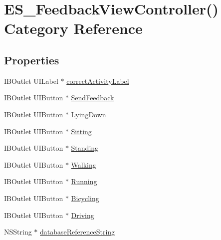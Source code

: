\hypertarget{category_e_s___feedback_view_controller_07_08}{\section{E\+S\+\_\+\+Feedback\+View\+Controller() Category Reference}
\label{category_e_s___feedback_view_controller_07_08}
}
\subsection*{Properties}
\begin{DoxyCompactItemize}
\item 
I\+B\+Outlet U\+I\+Label $\ast$ \hyperlink{category_e_s___feedback_view_controller_07_08_a14a8497fab3b0e86608a9fb3eed36b7f}{correct\+Activity\+Label}
\item 
I\+B\+Outlet U\+I\+Button $\ast$ \hyperlink{category_e_s___feedback_view_controller_07_08_a633997e737c481f734609ea35d69b2c2}{Send\+Feedback}
\item 
I\+B\+Outlet U\+I\+Button $\ast$ \hyperlink{category_e_s___feedback_view_controller_07_08_a07c0e4441a4680a2bd9ab859f7b170fc}{Lying\+Down}
\item 
I\+B\+Outlet U\+I\+Button $\ast$ \hyperlink{category_e_s___feedback_view_controller_07_08_a996c150ceb2ffba793c444bc74144921}{Sitting}
\item 
I\+B\+Outlet U\+I\+Button $\ast$ \hyperlink{category_e_s___feedback_view_controller_07_08_a875cdbd13390c7638b76aabc44e8c3c8}{Standing}
\item 
I\+B\+Outlet U\+I\+Button $\ast$ \hyperlink{category_e_s___feedback_view_controller_07_08_a86cdae0b61f5860ae0177caf8463297b}{Walking}
\item 
I\+B\+Outlet U\+I\+Button $\ast$ \hyperlink{category_e_s___feedback_view_controller_07_08_af9f0690aa9715a33a3bcc8d6d49b8348}{Running}
\item 
I\+B\+Outlet U\+I\+Button $\ast$ \hyperlink{category_e_s___feedback_view_controller_07_08_ad47899efe98d569b087c0d64f30d3392}{Bicycling}
\item 
I\+B\+Outlet U\+I\+Button $\ast$ \hyperlink{category_e_s___feedback_view_controller_07_08_a29e3cf89b7b6756fbf8c19f62f01a7a7}{Driving}
\item 
N\+S\+String $\ast$ \hyperlink{category_e_s___feedback_view_controller_07_08_a77b62c79eca024cb492b4ee11c8a357a}{database\+Reference\+String}
\end{DoxyCompactItemize}



